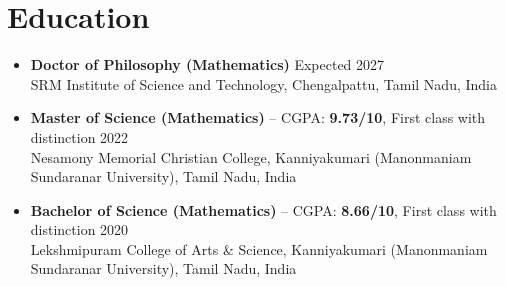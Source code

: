 \documentclass[A4,11pt]{article}
\begin{document}
\section{\textbf{\huge Education}}
\begin{itemize}[leftmargin=0.5cm, label={}]
	\item \textbf{Doctor of Philosophy (Mathematics)} \hfill Expected 2027\\
	SRM Institute of Science and Technology, Chengalpattu, Tamil Nadu, India
	\item \textbf{Master of Science (Mathematics)} -- CGPA: \textbf{9.73/10}, First class with distinction \hfill 2022\\
	Nesamony Memorial Christian College, Kanniyakumari (Manonmaniam Sundaranar University), Tamil Nadu, India
	\item \textbf{Bachelor of Science (Mathematics)} -- CGPA: \textbf{8.66/10}, First class with distinction \hfill 2020\\
	Lekshmipuram College of Arts \& Science, Kanniyakumari (Manonmaniam Sundaranar University), Tamil Nadu, India
\end{itemize}

\end{document}
